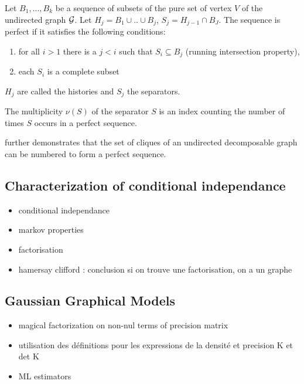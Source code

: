  \begin{definition}
 Let $B_1,...,B_k$ be a sequence of subsets of the pure set of vertex $V$ of the undirected graph $\mathcal{G}$. Let $H_j=B_1\cup .. \cup B_j$, $S_j = H_{j-1} \cap B_J$. The sequence is perfect if it satisfies the following conditions:
 \begin{enumerate}[label=(\roman*)]
 \item for all $i>1$ there is a $j<i$ such that $S_i \subseteq B_j$ (running intersection property),
 \item each $S_i$ is a complete subset
 \end{enumerate}
 $H_j$ are called the histories and $S_j$ the separators.
 \end{definition}
 \begin{definition}
 The multiplicity $\nu (S)$ of the separator $S$ is an index counting the number of times $S$ occurs in a perfect sequence.
 \end{definition}
 \citet{Lau96} further demonstrates that the set of cliques of an undirected decomposable graph can be numbered to form a perfect sequence. 
 
 \subsection{Characterization of conditional independance}
\begin{itemize}
\item conditional independance
\item markov properties
\item factorisation
\item hamersay clifford : conclusion si on trouve une factorisation, on a un graphe
\end{itemize}
 
 \subsection{Gaussian Graphical Models}
  \begin{itemize}
 \item magical factorization on non-nul terms of precision matrix
 \item utilisation des définitions pour les expressions de la densité et precision K et det K
 \item ML estimators
 \end{itemize}

